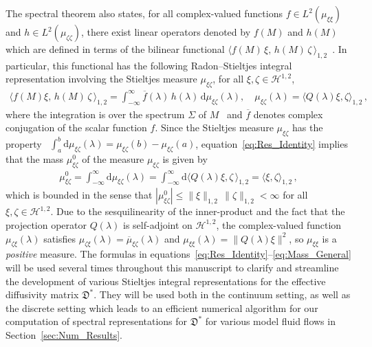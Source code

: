 \documentclass[english,12pt,jmp,graphicx]{revtex4-1}
\newcommand{\secref}[1]{Section~\ref{#1}}
\newcommand{\Dg}{\mathfrak{D}}
\newcommand{\Hs}{\mathscr{H}}
\newcommand{\Hc}{\mathcal{H}}
\renewcommand{\d}{\mathrm{d}}
\begin{document}
The spectral theorem also states, for all complex-valued
functions $f\in L^2(\mu_{\xi\xi})$ and $h\in L^2(\mu_{\zeta\zeta})$,
there exist linear operators denoted by $f(M)$ and $h(M)$ which
are defined in terms of the bilinear functional
$\langle f(M)\,\xi,\,h(M)\,\zeta\,\rangle_{1,2}$~\cite{Stone:64}. In
particular, this functional has the following Radon--Stieltjes
integral representation involving the Stieltjes measure
$\mu_{\xi\zeta}$, for all $\xi,\zeta\in\Hs^{1,2}$,       
% 
\begin{align}\label{eq:Spectral_Theorem}  
  \langle f(M)\xi,\,h(M)\,\zeta\,\rangle_{1,2}=
  \int_{-\infty}^\infty\overline{f}(\lambda)\,h(\lambda)\,\d\mu_{\xi\zeta}(\lambda),
  \quad
  \mu_{\xi\zeta}(\lambda)=\langle Q(\lambda)\xi,\zeta\rangle_{1,2}\,,
\end{align}
%
where the integration is over the spectrum $\Sigma$ of
$M$~\cite{Reed-1980,Stone:64} and $\overline{f}$ denotes complex
conjugation of the scalar function $f$. Since the Stieltjes measure
$\mu_{\xi\zeta}$ has the property~\cite{Stone:64}
$\int_a^b\d\mu_{\xi\zeta}(\lambda)=\mu_{\xi\zeta}(b)-\mu_{\xi\zeta}(a)$,
equation~\eqref{eq:Res_Identity} implies that the mass
$\mu^0_{\xi\zeta}$ of the measure $\mu_{\xi\zeta}$ is given by
% 
\begin{align}\label{eq:Mass_General}
  \mu^0_{\xi\zeta}
  =\int_{-\infty}^\infty\d\mu_{\xi\zeta}(\lambda)
  =\int_{-\infty}^\infty\d\langle Q(\lambda)\xi,\zeta\,\rangle_{1,2}
  =\langle\xi,\zeta\rangle_{1,2}\,,
\end{align}
%
which is bounded in the sense that
$|\mu^0_{\xi\zeta}|\leq\|\xi\|_{1,2}\,\|\zeta\|_{1,2}<\infty$ for
all $\xi,\zeta\in\Hs^{1,2}$.
Due to the sesquilinearity of
the inner-product and the fact that the projection operator $Q(\lambda)$
is self-adjoint on $\Hs^{1,2}$, the complex-valued function $\mu_{\zeta\xi}(\lambda)$
satisfies $\mu_{\zeta\xi}(\lambda)=\overline{\mu}_{\xi\zeta}(\lambda)$ and 
$\mu_{\xi\xi}(\lambda)=\|Q(\lambda)\xi\|^2$, so $\mu_{\xi\xi}$ is a
\emph{positive} measure. The formulas in
equations~\eqref{eq:Res_Identity}--\eqref{eq:Mass_General} will be
used several times throughout this manuscript to clarify and
streamline the development of various Stieltjes integral
representations for
the effective diffusivity matrix $\Dg^*$. They will be used both in
the continuum setting, as well as the discrete setting which leads to
an efficient numerical algorithm for our computation of spectral
representations for $\Dg^*$ for various model fluid flows in
\secref{sec:Num_Results}.
\end{document}
